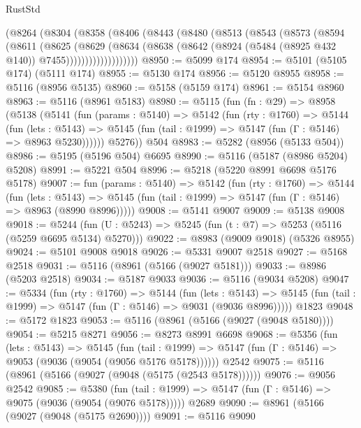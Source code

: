 \begin{lexlean}{RustStd}
\begin{coremodule}
{\begin{coremodule}
{{{{{{{{{{{{{{{{{{{{{{{{{{{{{{{        (@8264
          (@8304
            (@8358
              (@8406
                (@8443
                  (@8480
                    (@8513
                      (@8543
                        (@8573
                          (@8594
                            (@8611
                              (@8625
                                (@8629
                                  (@8634
                                    (@8638
                                      (@8642
                                        (@8924 (@5484 (@8925 @432 @140)) @7455)))))))))))))))))))
@8950 := @5099 @174
@8954 := @5101 (@5105 @174) (@5111 @174)
@8955 := @5130 @174
@8956 := @5120 @8955
@8958 := @5116 (@8956 @5135)
@8960 := @5158 (@5159 @174)
@8961 := @5154 @8960
@8963 := @5116 (@8961 @5183)
@8980 := @5115
    (fun (fn : @29) =>
    @8958
      (@5138
        (@5141
          (fun (params : @5140) =>
          @5142
            (fun (rty : @1760) =>
            @5144
              (fun (lets : @5143) =>
              @5145 (fun (tail : @1999) => @5147 (fun (Γ : @5146) => @8963 @5230))))))
        @5276))
    @504
@8983 := @5282 (@8956 (@5133 @504))
@8986 := @5195 (@5196 @504) @6695
@8990 := @5116 (@5187 (@8986 @5204) @5208)
@8991 := @5221 @504
@8996 := @5218 (@5220 @8991 @6698 @5176 @5178)
@9007 := fun (params : @5140) =>
  @5142
    (fun (rty : @1760) =>
    @5144
      (fun (lets : @5143) =>
      @5145 (fun (tail : @1999) => @5147 (fun (Γ : @5146) => @8963 (@8990 @8996)))))
@9008 := @5141 @9007
@9009 := @5138 @9008
@9018 := @5244 (fun (U : @5243) => @5245 (fun (t : @7) => @5253 (@5116 (@5259 @6695 @5134) @5270)))
@9022 := @8983 (@9009 @9018) (@5326 @8955)
@9024 := @5101 @9008 @9018
@9026 := @5331 @9007 @2518
@9027 := @5168 @2518
@9031 := @5116 (@8961 (@5166 (@9027 @5181)))
@9033 := @8986 (@5203 @2518)
@9034 := @5187 @9033
@9036 := @5116 (@9034 @5208)
@9047 := @5334
    (fun (rty : @1760) =>
    @5144
      (fun (lets : @5143) =>
      @5145 (fun (tail : @1999) => @5147 (fun (Γ : @5146) => @9031 (@9036 @8996)))))
    @1823
@9048 := @5172 @1823
@9053 := @5116 (@8961 (@5166 (@9027 (@9048 @5180))))
@9054 := @5215 @8271
@9056 := @8273 @8991 @6698
@9068 := @5356
    (fun (lets : @5143) =>
    @5145
      (fun (tail : @1999) => @5147 (fun (Γ : @5146) => @9053 (@9036 (@9054 (@9056 @5176 @5178))))))
    @2542
@9075 := @5116 (@8961 (@5166 (@9027 (@9048 (@5175 (@2543 @5178))))))
@9076 := @9056 @2542
@9085 := @5380
    (fun (tail : @1999) => @5147 (fun (Γ : @5146) => @9075 (@9036 (@9054 (@9076 @5178)))))
    @2689
@9090 := @8961 (@5166 (@9027 (@9048 (@5175 @2690))))
@9091 := @5116 @9090
}}}}}}}}}}}}}}}}}}}}}}}}}}}}}}}
\end{coremodule}}
\end{coremodule}
\end{lexlean}
